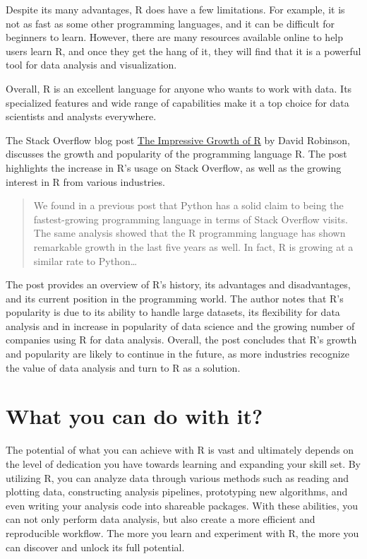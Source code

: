\documentclass[
]{book}
\begin{document}
Despite its many advantages, R does have a few limitations. For example, it is not as fast as some other programming languages, and it can be difficult for beginners to learn. However, there are many resources available online to help users learn R, and once they get the hang of it, they will find that it is a powerful tool for data analysis and visualization.

Overall, R is an excellent language for anyone who wants to work with data. Its specialized features and wide range of capabilities make it a top choice for data scientists and analysts everywhere.

The Stack Overflow blog post \href{https://stackoverflow.blog/2017/10/10/impressive-growth-r/}{The Impressive Growth of R} by David Robinson, discusses the growth and popularity of the programming language R. The post highlights the increase in R's usage on Stack Overflow, as well as the growing interest in R from various industries.

\begin{quote}
We found in a previous post that Python has a solid claim to being the
fastest-growing programming language in terms of Stack Overflow visits.
The same analysis showed that the R programming language has shown remarkable
growth in the last five years as well. In fact, R is growing at a similar rate to Python\ldots{}
\end{quote}

The post provides an overview of R's history, its advantages and disadvantages, and its current position in the programming world. The author notes that R's popularity is due to its ability to handle large datasets, its flexibility for data analysis and in increase in popularity of data science and the growing number of companies using R for data analysis. Overall, the post concludes that R's growth and popularity are likely to continue in the future, as more industries recognize the value of data analysis and turn to R as a solution.

\hypertarget{what-you-can-do-with-it}{%
\section*{What you can do with it?}\label{what-you-can-do-with-it}}

The potential of what you can achieve with R is vast and ultimately depends on the level of dedication you have towards learning and expanding your skill set. By utilizing R, you can analyze data through various methods such as reading and plotting data, constructing analysis pipelines, prototyping new algorithms, and even writing your analysis code into shareable packages. With these abilities, you can not only perform data analysis, but also create a more efficient and reproducible workflow. The more you learn and experiment with R, the more you can discover and unlock its full potential.
\end{document}
